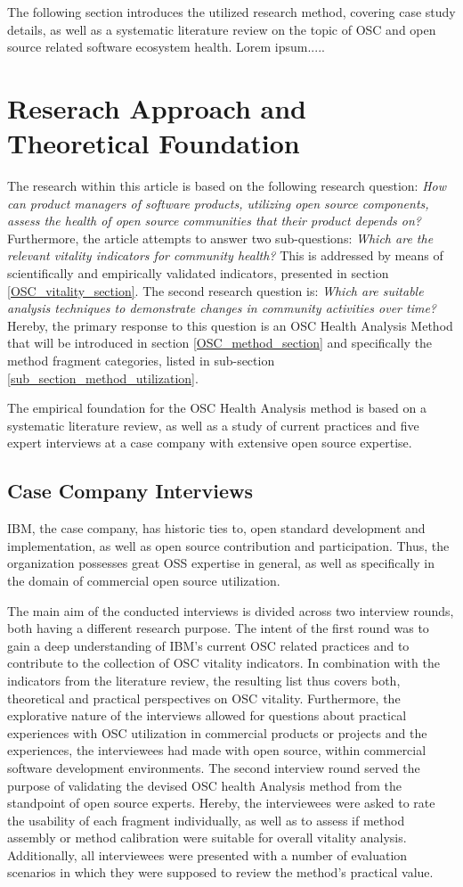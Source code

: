 \documentclass[final,5p,times,twocolumn]{elsarticle}
\begin{document}
The following section introduces the utilized research method, covering case study details, as well as a systematic literature review on the topic of OSC and open source related software ecosystem health. Lorem ipsum.....
\section{Reserach Approach and Theoretical Foundation}
\label{reserach_method_section}
The research within this article is based on the following research question: \textit{How can product managers of software products, utilizing open source components, assess the health of open source communities that their product depends on?} Furthermore, the article attempts to answer two sub-questions: \textit{Which are the relevant vitality indicators for community health?} This is addressed by means of scientifically and empirically validated indicators, presented in section \ref{OSC_vitality_section}. The second research question is: \textit{Which are suitable analysis techniques to demonstrate changes in community activities over time?} Hereby, the primary response to this question is an OSC Health Analysis Method that will be introduced in section \ref{OSC_method_section} and specifically the method fragment categories, listed in sub-section \ref{sub_section_method_utilization}.

The empirical foundation for the OSC Health Analysis method is based on a systematic literature review, as well as a study of current practices and five expert interviews at a case company with extensive open source expertise.
\subsection{Case Company Interviews}
IBM, the case company, has historic ties to, open standard development and implementation, as well as open source contribution and participation. Thus, the organization possesses great OSS expertise in general, as well as specifically in the domain of commercial open source utilization.

The main aim of the conducted interviews is divided across two interview rounds, both having a different research purpose. The intent of the first round was to gain a deep understanding of IBM’s current OSC related practices and to contribute to the collection of OSC vitality indicators. In combination with the indicators from the literature review, the resulting list thus covers both, theoretical and practical perspectives on OSC vitality. Furthermore, the explorative nature of the interviews allowed for questions about practical experiences with OSC utilization in commercial products or projects and the experiences, the interviewees had made with open source, within commercial software development environments. The second interview round served the purpose of validating the devised OSC health Analysis method from the standpoint of open source experts. Hereby, the interviewees were asked to rate the usability of each fragment individually, as well as to assess if method assembly or method calibration were suitable for overall vitality analysis. Additionally, all interviewees were presented with a number of evaluation scenarios in which they were supposed to review the method’s practical value.
\end{document}
